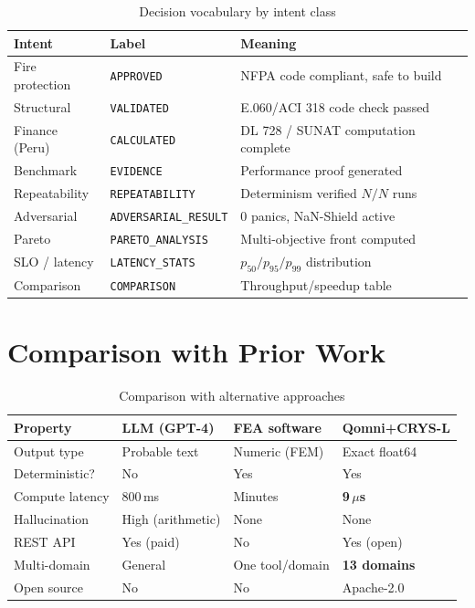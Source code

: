 \documentclass[11pt]{article}
\begin{document}
\begin{table}[h]
\centering
\caption{Decision vocabulary by intent class}
\begin{tabular}{lll}
\toprule
\textbf{Intent} & \textbf{Label} & \textbf{Meaning} \\
\midrule
Fire protection & \texttt{APPROVED}           & NFPA code compliant, safe to build \\
Structural      & \texttt{VALIDATED}          & E.060/ACI 318 code check passed \\
Finance (Peru)  & \texttt{CALCULATED}         & DL 728 / SUNAT computation complete \\
Benchmark       & \texttt{EVIDENCE}           & Performance proof generated \\
Repeatability   & \texttt{REPEATABILITY}      & Determinism verified $N/N$ runs \\
Adversarial     & \texttt{ADVERSARIAL\_RESULT}& 0 panics, NaN-Shield active \\
Pareto          & \texttt{PARETO\_ANALYSIS}   & Multi-objective front computed \\
SLO / latency   & \texttt{LATENCY\_STATS}     & $p_{50}/p_{95}/p_{99}$ distribution \\
Comparison      & \texttt{COMPARISON}         & Throughput/speedup table \\
\bottomrule
\end{tabular}
\end{table}

\section{Comparison with Prior Work}

\begin{table}[h]
\centering
\caption{Comparison with alternative approaches}
\begin{tabularx}{\textwidth}{lXXX}
\toprule
\textbf{Property} & \textbf{LLM (GPT-4)} & \textbf{FEA software} & \textbf{Qomni+CRYS-L} \\
\midrule
Output type     & Probable text         & Numeric (FEM)         & Exact float64 \\
Deterministic?  & No                    & Yes                   & Yes \\
Compute latency & 800\,ms               & Minutes               & \textbf{9\,$\mu$s} \\
Hallucination   & High (arithmetic)     & None                  & None \\
REST API        & Yes (paid)            & No                    & Yes (open) \\
Multi-domain    & General               & One tool/domain       & \textbf{13 domains} \\
Open source     & No                    & No                    & Apache-2.0 \\
\bottomrule
\end{tabularx}
\end{table}
\end{document}
